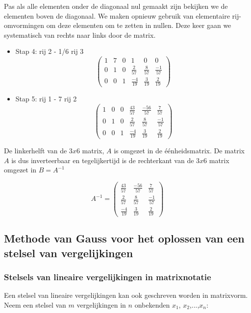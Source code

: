 Pas als alle elementen onder de diagonaal nul gemaakt zijn bekijken we de elementen boven de diagonaal. We maken opnieuw gebruik van elementaire rij-omvormingen om deze elementen om te zetten in nullen. Deze keer gaan we systematisch van rechts naar links door de matrix.

\begin{itemize}
	\item Stap 4: rij 2 - 1/6 rij 3
	\[ \left( \begin{matrix}
	1 & 7 & 0 & 1 & 0 & 0 \\
	0 & 1 & 0 & \frac{2}{57} & \frac{8}{57} & \frac{-1}{57} \\
	0 & 0 & 1 & \frac{-4}{19} & \frac{3}{19} & \frac{2}{19} \end{matrix} \right) 
	\]
	\item Stap 5: rij 1 - 7 rij 2
	\[ \left( \begin{matrix}
	1 & 0 & 0 & \frac{43}{57} & \frac{-56}{57} & \frac{7}{57} \\
	0 & 1 & 0 & \frac{2}{57} & \frac{8}{57} & \frac{-1}{57} \\
	0 & 0 & 1 & \frac{-4}{19} & \frac{3}{19} & \frac{2}{19} \end{matrix} \right) 
	\]
\end{itemize}

De linkerhelft van de $3x6$ matrix, $A$ is omgezet in de \'{e}\'{e}nheidsmatrix. De matrix $A$ is dus inverteerbaar en tegelijkertijd is de rechterkant van de $3x6$ matrix omgezet in $B=A^{-1}$

\[  A^{-1}=  \left( \begin{matrix}
\frac{43}{57} & \frac{-56}{57} & \frac{7}{57} \\
\frac{2}{57} & \frac{8}{57} & \frac{-1}{57} \\
\frac{-4}{19} & \frac{3}{19} & \frac{2}{19} \end{matrix} \right) 
\]

\subsection{Methode van Gauss voor het oplossen van een stelsel van vergelijkingen}

\subsubsection{Stelsels van lineaire vergelijkingen in matrixnotatie}

Een stelsel van lineaire vergelijkingen kan ook geschreven worden in matrixvorm. Neem een stelsel van $m$ vergelijkingen in $n$ onbekenden $x_1$, $x_2$,...,$x_n$:

